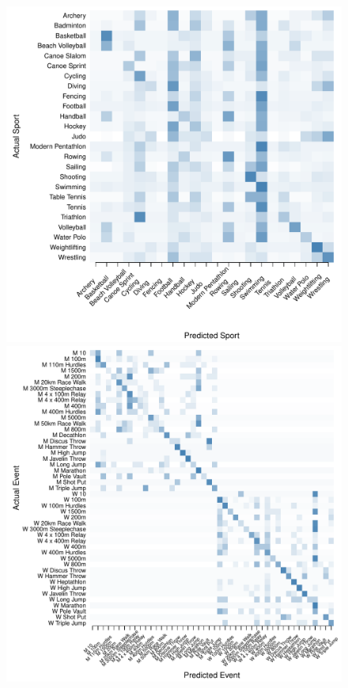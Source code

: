 \begin{figure}
\begin{center}
\begin{minipage}{0.20\textwidth}
\begin{center}
      \includegraphics[scale=0.20]{../graphics/sportANN-tst.pdf}
    \end{center}
  \end{minipage}
    \hspace{0.05\textwidth}
    \begin{minipage}{0.20\textwidth}
    \begin{center}
      \includegraphics[scale=0.20]{../graphics/athletesANN-trn.pdf}

\end{center}
\end{minipage}
\end{center}
\end{figure}
